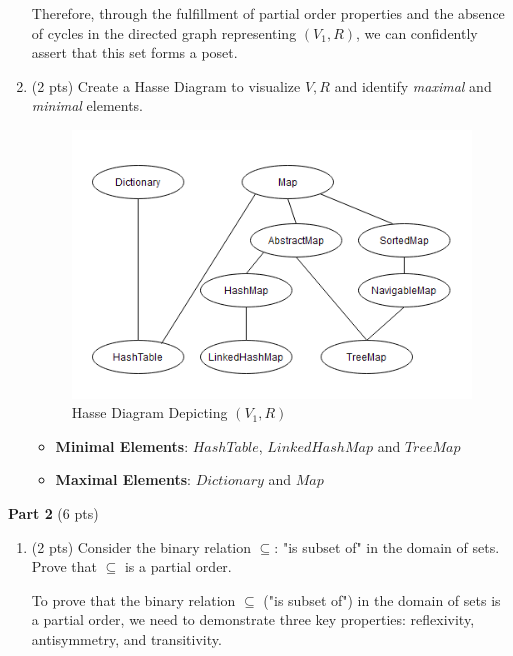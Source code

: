 \documentclass[12pt]{article}
\begin{document}
\begin{spacing}{1.5}
\begin{enumerate}
		      Therefore, through the fulfillment of partial order properties and the absence of cycles in the directed graph representing $(V_1, R)$, we can confidently assert that this set forms a poset.       
		      		      		              
		\item (2 pts) Create a Hasse Diagram to visualize $V, R$ and identify \textit{maximal} and \textit{minimal} elements.
		      		      
		      \begin{figure}[htp]
		      	\centering
		      	\includegraphics{static/HasseDiagram_6_3_1.png}
		      	\caption{Hasse Diagram Depicting $(V_1,R)$}
		      	\label{fig:figure}
		      \end{figure}
		      		           
		      \begin{itemize}
		      	\item \textbf{Minimal Elements}: $HashTable$, $LinkedHashMap$ and $TreeMap$
		      	\item \textbf{Maximal Elements}: $Dictionary$ and $Map$
		      \end{itemize}
		      		      		      
	\end{enumerate}
			
	\noindent \textbf{Part 2} (6 pts)
			
	\begin{enumerate}
		\item (2 pts) Consider the binary relation $\subseteq$: "is subset of" in the domain of sets. Prove that $\subseteq$ is a partial order.
		      		      
		      To prove that the binary relation $\subseteq$ ("is subset of") in the domain of sets is a partial order, we need to demonstrate three key properties: reflexivity, antisymmetry, and transitivity.
		      		      

\end{enumerate}
\end{spacing}
\end{document}
